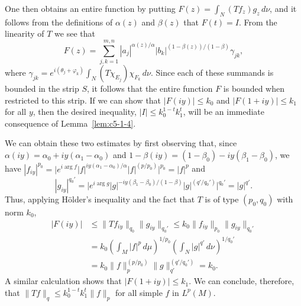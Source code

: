 One then obtains an entire function by putting
$F(z) = \int_{N}(Tf_{z})g_{z}\,d\nu$, and it follows from the definitions of
$\alpha(z)$ and $\beta(z)$ that $F(t) = I$. From the linearity of $T$ we see
that
\[
F(z)=\sum_{j,k=1}^{m,n}|a_{j}|^{\alpha(z)/\alpha}|b_{k}|^{(1-\beta(z))/(1-\beta)}\gamma_{jk},
\]
where
$\gamma_{jk} = e^{i(\theta_{j} + \varphi_{k})}\int_{N}(T\chi_{E_{j}})\chi_{F_{k}}\,d\nu$.
Since each of these summands is bounded in the strip $S$, it follows that the
entire function $F$ is bounded when restricted to this strip. If we can show
that $|F(iy)| \leq k_{0}$ and $|F(1 + iy)| \leq k_{1}$ for all $y$, then the
desired inequality, $|I| \leq k_{0}^{1-t}k_{1}^{t}$, will be an immediate
consequence of Lemma~\ref{lem:c5-1-4}.

We can obtain these two estimates by first observing that, since
$\alpha(iy) = \alpha_{0} + iy(\alpha_{1} - \alpha_{0})$ and
$1 - \beta(iy) = (1 - \beta_{0}) - iy(\beta_{1} - \beta_{0})$, we have
$|f_{iy}|^{p_{0}} = \bigl|e^{i\arg f}|f|^{iy(\alpha_{1} - \alpha_{0})/\alpha}|f|^{(p/p_{0})}\bigr|^{p_{0}} = |f|^{p}$
and
\[
|g_{iy}|^{q_{0}'}=\bigl|e^{i\arg g}|g|^{-iy(\beta_{1}-\beta_{0})/(1-\beta)}|g|^{(q'/q_{0}')}\bigr|^{q_{0}'}=|g|^{q'}.
\]
Thus, applying H\"older's inequality and the fact that $T$ is of type
$(p_{0}, q_{0})$ with norm $k_{0}$,
\begin{align*}
|F(iy)|&\leq\|Tf_{iy}\|_{q_{0}}\|g_{iy}\|_{q_{0}'}
\leq k_{0}\|f_{iy}\|_{p_{0}}\|g_{iy}\|_{q_{0}'}\\
&=k_{0}\left(\int_{M}|f|^{p}\,d\mu\right)^{1/p_{0}}
\left(\int_{N}|g|^{q'}\,d\nu\right)^{1/q_{0}'}\\
&=k_{0}\|f\|_{p}^{(p/p_{0})}\|g\|_{q'}^{(q'/q_{0}')}=k_{0}.
\end{align*}
A similar calculation shows that $|F(1 + iy)| \leq k_{1}$. We can conclude,
therefore, that $\|Tf\|_{q} \leq k_{0}^{1-t}k_{1}^{t}\|f\|_{p}$ for all simple
$f$ in $L^{p}(M)$.

